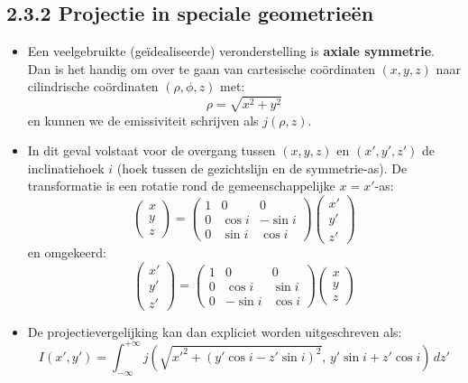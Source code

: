 \documentclass[10pt,a4paper]{article}
\renewenvironment{equation}{\begin{equation*}}{\end{equation*}}
\begin{document}
\subsection*{2.3.2 Projectie in speciale geometrieën}
\begin{itemize}
  \item Een veelgebruikte (geïdealiseerde) veronderstelling is \textbf{axiale symmetrie}. Dan is het handig om over te gaan van cartesische coördinaten $(x,y,z)$ naar cilindrische coördinaten $(\rho,\phi,z)$ met:
  \begin{equation}
    \rho = \sqrt{x^2+y^2}
    \tag{2.15}
  \end{equation}
  en kunnen we de emissiviteit schrijven als $j(\rho,z)$.
  \item In dit geval volstaat voor de overgang tussen $(x,y,z)$ en $(x',y',z')$ de inclinatiehoek $i$ (hoek tussen de gezichtslijn en de symmetrie-as). De transformatie is een rotatie rond de gemeenschappelijke $x=x'$-as:
  \begin{equation}
    \begin{pmatrix}
      x \\ y \\ z
    \end{pmatrix}
    =
    \begin{pmatrix}
      1 & 0 & 0 \\
      0 & \cos i & -\sin i \\
      0 & \sin i & \cos i
    \end{pmatrix}
    \begin{pmatrix}
      x' \\ y' \\ z'
    \end{pmatrix}
    \tag{2.16}
  \end{equation}
  en omgekeerd:
  \begin{equation}
    \begin{pmatrix}
      x' \\ y' \\ z'
    \end{pmatrix}
    =
    \begin{pmatrix}
      1 & 0 & 0 \\
      0 & \cos i & \sin i \\
      0 & -\sin i & \cos i
    \end{pmatrix}
    \begin{pmatrix}
      x \\ y \\ z
    \end{pmatrix}
    \tag{2.17}
  \end{equation}
  \item De projectievergelijking kan dan expliciet worden uitgeschreven als:
  \begin{equation}
    I(x',y') = \int_{-\infty}^{+\infty}
    j\!\left(
      \sqrt{x'^2 + (y'\cos i - z'\sin i)^2},
      \,y'\sin i + z'\cos i
    \right)\,dz'
    \tag{2.18}
  \end{equation}


\end{itemize}
\end{document}
